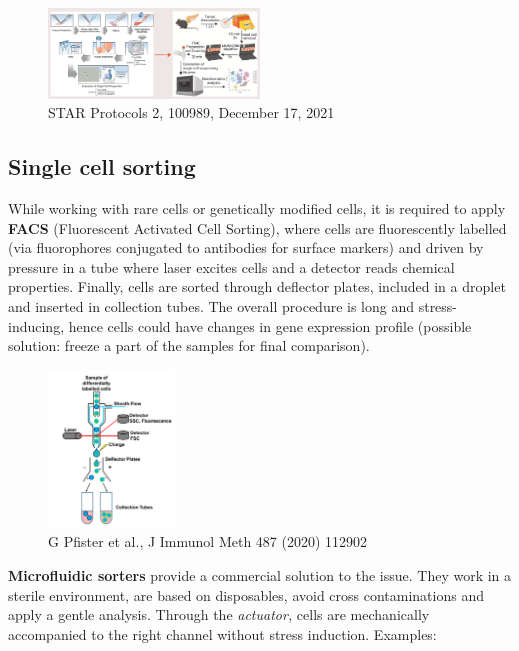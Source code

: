 \begin{figure}
\centering
\includegraphics[width=0.5\textwidth]{images/Screenshot_1.png}
\caption{STAR Protocols 2, 100989, December 17, 2021}
\end{figure}

\hypertarget{single-cell-sorting}{%
\subsection{Single cell sorting}\label{single-cell-sorting}}

While working with rare cells or genetically modified cells, it is
required to apply \textbf{FACS} (Fluorescent Activated Cell Sorting),
where cells are fluorescently labelled (via fluorophores conjugated to
antibodies for surface markers) and driven by pressure in a tube
where laser excites cells and a detector reads chemical properties.
Finally, cells are sorted through deflector plates, included in a
droplet and inserted in collection tubes. The overall procedure is long
and stress-inducing, hence cells could have changes in gene expression
profile (possible solution: freeze a part of the samples for final
comparison).

\begin{figure}
\centering
\includegraphics[width=0.3\textwidth]{images/Screenshot_2.png}
\caption{G Pfister et al., J Immunol Meth 487 (2020) 112902 }
\end{figure}


\textbf{Microfluidic sorters} provide a commercial solution to the
issue. They work in a sterile environment, are based on disposables,
avoid cross contaminations and apply a gentle analysis. Through the
\emph{actuator,} cells are mechanically accompanied to the right channel
without stress induction. Examples:

